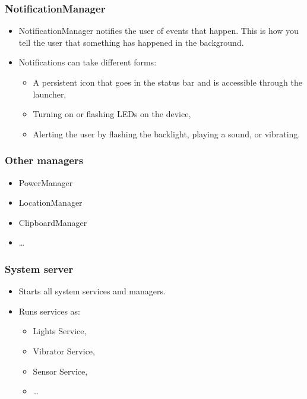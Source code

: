 \documentclass[10pt,xcolor=pdflatex]{beamer}
\begin{document}
\begin{frame}[fragile]\frametitle{NotificationManager}
\begin{itemize}
	\item NotificationManager notifies the user of events that happen. This is how you tell the user that something has happened in the background.
	\item Notifications can take different forms:
      \begin{itemize}
    	\item A persistent icon that goes in the status bar and is accessible through the launcher,
    	\item Turning on or flashing LEDs on the device,
    	\item Alerting the user by flashing the backlight, playing a sound, or vibrating.
      \end{itemize}
\end{itemize}
\end{frame}



\begin{frame}[fragile]\frametitle{Other managers}
\begin{itemize}
	\item PowerManager
	\item LocationManager
    \item ClipboardManager
    \item \ldots
\end{itemize}
\end{frame}


\begin{frame}[fragile]\frametitle{System server}
\begin{itemize}
	\item Starts all system services and managers.
	\item Runs services as:
	  \begin{itemize}
	      \item Lights Service,
	      \item Vibrator Service,
	      \item Sensor Service,
	      \item \ldots
	  \end{itemize}
\end{itemize}
\end{frame}
\end{document}
